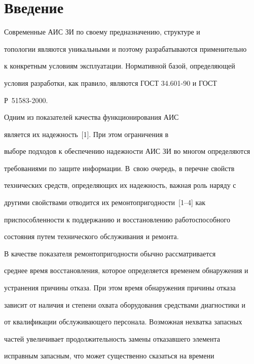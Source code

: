 \section{Введение}





     Современные АИС ЗИ по своему предназначению, структуре и 


топологии являются уникальными и поэтому разрабатываются применительно 


к конкретным условиям эксплуатации. Нормативной базой, определяющей 


условия разработки, как правило, являются ГОСТ 34.601-90 и ГОСТ 


     Р~51583-2000.


     


     Одним из показателей качества функционирования АИС


      является их надежность~[1]. При этом ограничения в 


выборе подходов к обеспечению надежности АИС ЗИ во многом определяются 


требованиями по защите информации. В~свою очередь, в перечне свойств 


технических средств, определяющих их надежность, важная роль наряду с 


другими свойствами отводится их ремонтопригодности~[1--4] как 


приспособленности к поддержанию и восстановлению работоспособного 


состояния путем технического обслуживания и ремонта.


     


     В качестве показателя ремонтопригодности обычно рассматривается 


среднее время восстановления, которое определяется временем обнаружения и 


устранения причины отказа. При этом время обнаружения причины отказа 


зависит от наличия и степени охвата оборудования средствами диагностики и 


от квалификации обслуживающего персонала. Возможная нехватка запасных 


частей увеличивает продолжительность замены отказавшего элемента 


исправным запасным, что может существенно сказаться на времени 


